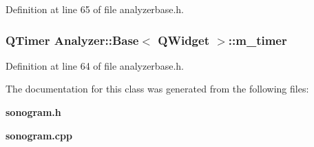 Definition at line 65 of file analyzerbase.h.
\subsubsection{\setlength{\rightskip}{0pt plus 5cm}QTimer {\bf Analyzer::Base}$<$ {\bf QWidget}  $>$::{\bf m\_\-timer}\hspace{0.3cm}{\tt  [protected, inherited]}}\label{classAnalyzer_1_1Base_Analyzer_1_1Basep0}




Definition at line 64 of file analyzerbase.h.

The documentation for this class was generated from the following files:\begin{CompactItemize}
\item 
{\bf sonogram.h}\item 
{\bf sonogram.cpp}\end{CompactItemize}
